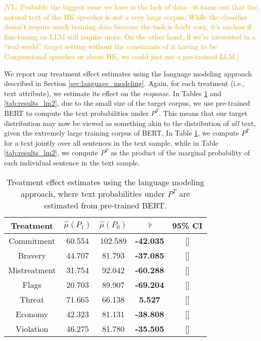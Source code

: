 \documentclass{article}
\newcommand{\vl}[1]{\textcolor{orange}{[VL: #1]}}
\begin{document}
\vl{Probably the biggest issue we have is the lack of data---it turns out that the natural text of the HK speeches is not a very large corpus. While the classifier doesn't require much training data because the task is fairly easy, it's unclear if fine-tuning an LLM will require more.
\newline
\newline
On the other hand, if we're interested in a ``real-world'' target setting without the constraints of it having to be Congressional speeches or about HK, we could just use a pre-trained LLM.}

We report our treatment effect estimates using the language modeling approach described in Section \ref{sec:language_modeling}. Again, for each treatment (i.e., text attribute), we estimate its effect on the \textit{response}. In Tables \ref{tab:results_lm1} and \ref{tab:results_lm2}, due to the small size of the target corpus, we use pre-trained BERT to compute the text probabilities under $P^T$. This means that our target distribution may now be viewed as something akin to the distribution of \textit{all} text, given the extremely large training corpus of BERT. In Table \ref{tab:results_lm1}, we compute $P^T$ for a text jointly over all sentences in the text sample, while in Table \ref{tab:results_lm2}, we compute $P^T$ as the product of the marginal probability of each individual sentence in the text sample.

\begin{table}[!ht]
    \centering
    \begin{tabular}{c|cccc}
        \toprule
        Treatment & $\hat{\mu}(P_1)$ & $\hat{\mu}(P_0)$ & $\hat{\tau}$ & 95\% CI \\
        \midrule
        Commitment & 60.554 & 102.589 & \textcolor{red!80!black}{\textbf{-42.035}} & [] \\
        Bravery & 44.707 & 81.793 & \textcolor{red!80!black}{\textbf{-37.085}} & [] \\
        Mistreatment & 31.754 & 92.042 & \textcolor{red!80!black}{\textbf{-60.288}} & [] \\
        Flags & 20.703 & 89.907 & \textcolor{red!80!black}{\textbf{-69.204}} & [] \\
        Threat & 71.665 & 66.138 & \textcolor{green!50!black}{\textbf{5.527}} & [] \\
        Economy & 42.323 & 81.131 & \textcolor{red!80!black}{\textbf{-38.808}} & [] \\
        Violation & 46.275 & 81.780 & \textcolor{red!80!black}{\textbf{-35.505}} & [] \\
        \bottomrule
    \end{tabular}
    \caption{Treatment effect estimates using the language modeling approach, where text probabilities under $P^T$ are estimated from pre-trained BERT.}
    \label{tab:results_lm1}
\end{table}
\end{document}
